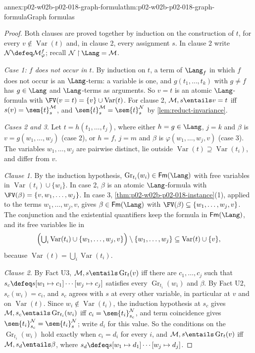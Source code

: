 \begin{annexitem}{annex:p02-w02b-p02-018-graph-formula}{thm:p02-w02b-p02-018-graph-formula}{Graph formulas}
\begin{proof}
Both clauses are proved together by induction on the construction of \(t\),
for every \(v\notin\operatorname{Var}(t)\) and, in clause 2, every
assignment \(s\).  In clause 2 write
\(\mathcal N\defeq\mathcal M^{f}_{\varphi}\); recall
\(\mathcal N\mathbin{\upharpoonright}\Lang=\mathcal M\).

\emph{Case 1: \(f\) does not occur in \(t\).}  By induction on \(t\), a
term of \(\Lang_f\) in which \(f\) does not occur is an \(\Lang\)-term: a
variable is one, and \(g(t_1,\ldots,t_k)\) with \(g\ne f\) has \(g\in\Lang\)
and \(\Lang\)-terms as arguments.  So \(v=t\) is an atomic
\(\Lang\)-formula with \(\FV(v=t)=\{v\}\cup\operatorname{Var}(t)\).  For
clause 2, \(\mathcal M,s\entails v=t\) iff
\(s(v)=\sem{t}^{\mathcal M}_s\), and
\(\sem{t}^{\mathcal M}_s=\sem{t}^{\mathcal N}_s\) by
\cref{lem:reduct-invariance}.

\emph{Cases 2 and 3.}  Let \(t=h(t_1,\ldots,t_j)\), where either
\(h=g\in\Lang\), \(j=k\) and \(\beta\) is \(v=g(w_1,\ldots,w_j)\) (case 2),
or \(h=f\), \(j=m\) and \(\beta\) is \(\varphi(w_1,\ldots,w_j,v)\) (case 3).
The variables \(w_1,\ldots,w_j\) are pairwise distinct, lie outside
\(\operatorname{Var}(t)\supseteq\operatorname{Var}(t_i)\), and differ from
\(v\).

\emph{Clause 1.}  By the induction hypothesis,
\(\operatorname{Gr}_{t_i}(w_i)\in\mathsf{Fm}(\Lang)\) with free variables in
\(\operatorname{Var}(t_i)\cup\{w_i\}\).  In case 2, \(\beta\) is an atomic
\(\Lang\)-formula with \(\FV(\beta)=\{v,w_1,\ldots,w_j\}\).  In case 3,
\cref{thm:p02-w02b-p02-018-instance}(1), applied to the terms
\(w_1,\ldots,w_j,v\), gives \(\beta\in\mathsf{Fm}(\Lang)\) with
\(\FV(\beta)\subseteq\{w_1,\ldots,w_j,v\}\).  The conjunction and the
existential quantifiers keep the formula in \(\mathsf{Fm}(\Lang)\), and its
free variables lie in
\[
 \Bigl(\textstyle\bigcup_i\operatorname{Var}(t_i)\cup\{w_1,\ldots,w_j,v\}\Bigr)
 \setminus\{w_1,\ldots,w_j\}
 \subseteq\operatorname{Var}(t)\cup\{v\},
\]
because \(\operatorname{Var}(t)=\bigcup_i\operatorname{Var}(t_i)\).

\emph{Clause 2.}  By Fact U3, \(\mathcal M,s\entails\operatorname{Gr}_{t}(v)\)
iff there are \(c_1,\ldots,c_j\) such that
\(s_c\defeq s[w_1\mapsto c_1]\cdots[w_j\mapsto c_j]\) satisfies every
\(\operatorname{Gr}_{t_i}(w_i)\) and \(\beta\).  By Fact U2,
\(s_c(w_i)=c_i\), and \(s_c\) agrees with \(s\) at every other variable, in
particular at \(v\) and on \(\operatorname{Var}(t)\).  Since
\(w_i\notin\operatorname{Var}(t_i)\), the induction hypothesis at \(s_c\)
gives \(\mathcal M,s_c\entails\operatorname{Gr}_{t_i}(w_i)\) iff
\(c_i=\sem{t_i}^{\mathcal N}_{s_c}\), and term coincidence gives
\(\sem{t_i}^{\mathcal N}_{s_c}=\sem{t_i}^{\mathcal N}_{s}\); write
\(d_i\) for this value.  So
the conditions on the \(\operatorname{Gr}_{t_i}(w_i)\) hold exactly when
\(c_i=d_i\) for every \(i\), and
\(\mathcal M,s\entails\operatorname{Gr}_{t}(v)\) iff
\(\mathcal M,s_d\entails\beta\), where
\(s_d\defeq s[w_1\mapsto d_1]\cdots[w_j\mapsto d_j]\).


\end{proof}
\end{annexitem}
